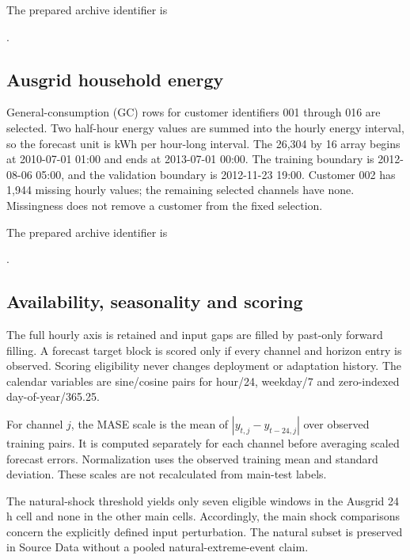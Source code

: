 \documentclass[11pt,a4paper]{article}
\begin{document}
The prepared archive identifier is\par\smallskip
{\footnotesize\ttfamily{}}.

\subsection{Ausgrid household energy}
General-consumption (GC) rows for customer identifiers 001 through 016 are selected. Two half-hour energy values are summed into the hourly energy interval, so the forecast unit is kWh per hour-long interval. The 26,304 by 16 array begins at 2010-07-01 01:00 and ends at 2013-07-01 00:00. The training boundary is 2012-08-06 05:00, and the validation boundary is 2012-11-23 19:00. Customer 002 has 1,944 missing hourly values; the remaining selected channels have none. Missingness does not remove a customer from the fixed selection.

The prepared archive identifier is\par\smallskip
{\footnotesize\ttfamily{}}.

\subsection{Availability, seasonality and scoring}
The full hourly axis is retained and input gaps are filled by past-only forward filling. A forecast target block is scored only if every channel and horizon entry is observed. Scoring eligibility never changes deployment or adaptation history. The calendar variables are sine/cosine pairs for hour/24, weekday/7 and zero-indexed day-of-year/365.25.

For channel $j$, the MASE scale is the mean of $|y_{t,j}-y_{t-24,j}|$ over observed training pairs. It is computed separately for each channel before averaging scaled forecast errors. Normalization uses the observed training mean and standard deviation. These scales are not recalculated from main-test labels.

\begin{table}[h]
\centering\caption{Eligible origins and natural-shock counts in the main experiment. Natural shocks are scored original-input windows exceeding the training 95th percentile of mean absolute standardized hourly context differences. Counts are per seed and identical across compared methods.}\label{tab:coverage}

\end{table}
The natural-shock threshold yields only seven eligible windows in the Ausgrid 24 h cell and none in the other main cells. Accordingly, the main shock comparisons concern the explicitly defined input perturbation. The natural subset is preserved in Source Data without a pooled natural-extreme-event claim.
\end{document}
